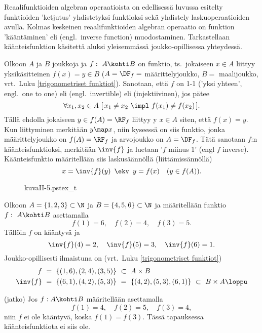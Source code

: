 Reaalifunktioiden algebran operaatioista on edellisessä luvussa esitelty funktioiden
'ketjutus' yhdistetyksi funktioksi sekä yhdistely laskuoperaatioiden avulla. Kolmas
keskeinen reaalifunktioiden algebran operaatio on funktion 'kääntäminen' eli
 (engl.\ inverse function) muodostaminen. Tarkastellaan
käänteisfunktion käsitettä aluksi yleisemmässä joukko-opillisessa yhteydessä.

Olkoon $A$ ja $B$ joukkoja ja $f:\ A \kohti B$ on funktio, ts.\ jokaiseen $x \in A$ liittyy
yksikäsitteinen $f(x)=y \in B$ ($A=\DF_f=$ määrittelyjoukko, $B=$ maalijoukko, vrt.\
Luku \ref{trigonometriset funktiot}). Sanotaan, että $f$ on 1-1 ('yksi yhteen', engl.\
one to one) eli  (engl.\ invertible) eli  (injektiivinen),
jos pätee
\[
\forall x_1,x_2 \in A\ [\,x_1 \neq x_2\ \impl\ f(x_1) \neq f(x_2)\,].
\]
Tällä ehdolla jokaiseen $y \in f(A)=\RF_f$ liittyy y $x \in A$ siten,
että $f(x)=y$. Kun liittyminen merkitään $y \map x$, niin kyseessä on siis funktio, jonka
määrittelyjoukko on $f(A)=\RF_f$ ja arvojoukko on $A=\DF_f$. Tätä sanotaan $f$:n 
käänteisfunktioksi, merkitään $\inv{f}$ ja luetaan '$f$ miinus 1' (engl $f$ inverse). 
Käänteisfunktio määritellään siis laskusäännöllä (liittämissännöllä) 
\[ 
x=\inv{f}(y)\,\ \ekv\,\ y=f(x) \quad (y \in f(A)).
\]  
\begin{figure}[H]
\begin{center}
{kuvaII-5.pstex_t}
\end{center}
\end{figure}
\begin{Exa} Olkoon $A=\{1,2,3\}\subset\N$ ja $B=\{4,5,6\}\subset\N$ ja määritellään funktio 
$f:\ A \kohti B$ asettamalla
\[
f(1)=6, \quad f(2)=4, \quad f(3)=5.
\]
Tällöin $f$ on kääntyvä ja
\[
\inv{f}(4)=2, \quad \inv{f}(5)=3, \quad \inv{f}(6)=1.
\]
Joukko-opillisesti ilmaistuna on (vrt.\ Luku \ref{trigonometriset funktiot})
\begin{align*}
f\       &=\ \{(1,6),(2,4),(3,5)\}\ \subset\ A \times B \\
\inv{f}\ &=\ \{(6,1),(4,2),(5,3)\}\ =\ \{(4,2),(5,3),(6,1)\}\ \subset\ B \times A \loppu
\end{align*}
\end{Exa}
\jatko \begin{Exa} (jatko) Jos $f: A \kohti B$ määritellään asettamalla
\[
f(1)=4, \quad f(2)=5, \quad f(3)=4,
\]
niin $f$ ei ole kääntyvä, koska $f(1)=f(3)$. Tässä tapauksessa käänteisfunktiota ei siis ole.
\loppu \end{Exa}
